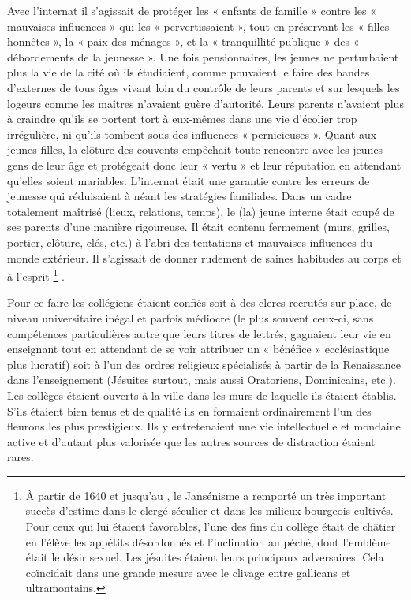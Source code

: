  Avec l'internat il s'agissait de protéger les « enfants de famille » contre les « mauvaises influences » qui les « pervertissaient », tout en préservant les « filles honnêtes », la « paix des ménages », et la « tranquillité publique » des « débordements de la jeunesse ». Une fois pensionnaires, les jeunes ne perturbaient plus la vie de la cité où ils étudiaient, comme pouvaient le faire des bandes d'externes de tous âges vivant loin du contrôle de leurs parents et sur lesquels les logeurs comme les maîtres n'avaient guère d'autorité. Leurs parents n'avaient plus à craindre qu'ils se portent tort à eux-mêmes dans une vie d'écolier trop irrégulière, ni qu'ils tombent sous des influences « pernicieuses ». Quant aux jeunes filles, la clôture des couvents empêchait toute rencontre avec les jeunes gens de leur âge et protégeait donc leur « vertu » et leur réputation en attendant qu'elles soient mariables. L'internat était une garantie contre les erreurs de jeunesse qui réduisaient à néant les stratégies familiales. Dans un cadre totalement maîtrisé (lieux, relations, temps), le (la) jeune interne était coupé de ses parents d'une manière rigoureuse. Il était contenu fermement (murs, grilles, portier, clôture, clés, etc.) à l'abri des tentations et mauvaises influences du monde extérieur. Il s'agissait de donner rudement de saines habitudes au corps et à l'esprit%
\footnote{À partir de 1640 et jusqu'au , le Jansénisme a remporté un très important succès d'estime dans le clergé séculier et dans les milieux bourgeois cultivés. Pour ceux qui lui étaient favorables, l'une des fins du collège était de châtier en l'élève les appétits désordonnés et l'inclination au péché, dont l'emblème était le désir sexuel. Les jésuites étaient leurs principaux adversaires. Cela coïncidait dans une grande mesure avec le clivage entre gallicans et ultramontains.}%
. 

 Pour ce faire les collégiens étaient confiés soit à des clercs recrutés sur place, de niveau universitaire inégal et parfois médiocre (le plus souvent ceux-ci, sans compétences particulières autre que leurs titres de lettrés, gagnaient leur vie en enseignant tout en attendant de se voir attribuer un « bénéfice » ecclésiastique plus lucratif) soit à l'un des ordres religieux spécialisés à partir de la Renaissance dans l'enseignement (Jésuites surtout, mais aussi Oratoriens, Dominicains, etc.). Les collèges étaient ouverts à la ville dans les murs de laquelle ils étaient établis. S'ils étaient bien tenus et de qualité ils en formaient ordinairement l'un des fleurons les plus prestigieux. Ils y entretenaient une vie intellectuelle et mondaine active et d'autant plus valorisée que les autres sources de distraction étaient rares. 

